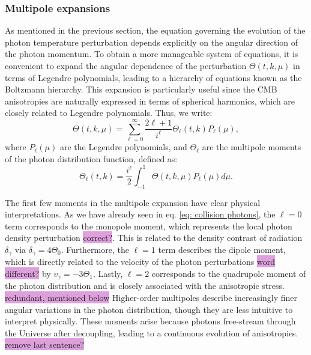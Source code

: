 \documentclass{aa}
\numberwithin{equation}{section}
\numberwithin{table}{section}
\numberwithin{figure}{section}
\begin{document}
\subsubsection{Multipole expansions}

As mentioned in the previous section, the equation governing the evolution of the photon temperature perturbation depends explicitly on the angular direction of the photon momentum. To obtain a more manageable system of equations, it is convenient to expand the angular dependence of the perturbation $\Theta(t, k, \mu)$ in terms of Legendre polynomials, leading to a hierarchy of equations known as the Boltzmann hierarchy. This expansion is particularly useful since the CMB anisotropies are naturally expressed in terms of spherical harmonics, which are closely related to Legendre polynomials. Thus, we write:
\begin{equation} 
  \Theta(t, k, \mu) = \sum_{\ell=0}^{\infty} \frac{2\ell+1}{i^\ell} \Theta_\ell(t, k) P_\ell(\mu), 
\end{equation}
where $P_\ell(\mu)$ are the Legendre polynomials, and $\Theta_\ell$ are the multipole moments of the photon distribution function, defined as:
\begin{equation} 
  \Theta_\ell(t, k) = \frac{i^\ell}{2} \int_{-1}^{1} \Theta(t, k, \mu) P_\ell(\mu) d\mu. 
\end{equation}

The first few moments in the multipole expansion have clear physical interpretations. As we have already seen in eq. \eqref{eq: collision photons}, the $\ell=0$ term corresponds to the monopole moment, which represents the local photon density perturbation \colorbox{Plum}{correct?}. This is related to the density contrast of radiation $\delta_\gamma$ via $\delta_\gamma = 4\Theta_0$. Furthermore, the $\ell=1$ term describes the dipole moment, which is directly related to the velocity of the photon perturbations \colorbox{Plum}{word different?} by $v_\gamma = -3\Theta_1$. Lastly, $\ell=2$ corresponds to the quadrupole moment of the photon distribution and is closely associated with the anisotropic stress. \colorbox{Plum}{redundant, mentioned below} Higher-order multipoles describe increasingly finer angular variations in the photon distribution, though they are less intuitive to interpret physically. These moments arise because photons free-stream through the Universe after decoupling, leading to a continuous evolution of anisotropies. \colorbox{Plum}{remove last sentence?} 
\end{document}
